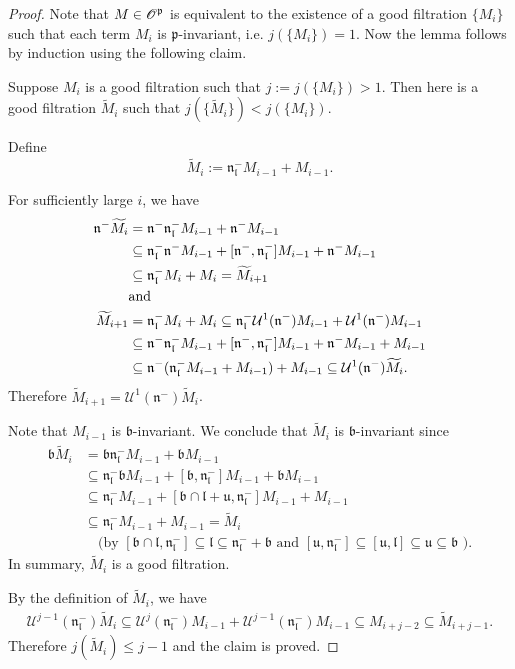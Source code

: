 \documentclass{amsart}[12pt]
\def\fbb{\mathfrak{b}}
\def\fnn{\mathfrak{n}}
\def\fpp{\mathfrak{p}}
\def\fuu{\mathfrak{u}}
\def\fll{\mathfrak{l}}
\def\fbb{\mathfrak{b}}
\def\cU{\mathcal{U}}
\def\tM{\widetilde{M}}
\renewcommand{\subset}{\subseteq}
\numberwithin{equation}{section}
\begin{document}
\begin{proof}
	
    Note that $M\in \sO^\fpp$ is equivalent to the existence of a good filtration $\{M_i\}$ such 
	that each term $M_i$ is $\fpp$-invariant, i.e. $j(\{M_i\}) = 1$. 
	Now the lemma follows by induction using the following claim. 

	 Suppose $M_i$ is a good filtration such that 
	$j:=j(\{M_i\})>1$. Then here is a good filtration $\tM_i$ such that $j(\{\tM_i\}) < j(\{M_i\})$.

	\proof
	Define 
	\[
		\tM_i := \fnn_\fll^- M_{i-1} + M_{i-1}.
	\]	

	For sufficiently large $i$, we have 
	\[
	\begin{split}
		\fnn^- \tM_i & = \fnm \fnlm M_{i-1} + \fnm M_{i-1}\\
		 &\subset  \fnlm \fnm M_{i-1} + [\fnm,\fnlm] M_{i-1} + \fnm M_{i-1} \\
		 &\subset \fnlm  M_i + M_i = \tM_{i+1} \\
		 & \text{and}\\
	\tM_{i+1} 	& = \fnn_\fll^- M_i + M_i \subset \fnlm \cU^1(\fnm) M_{i-1} +
	\cU^1(\fnm) M_{i-1} \\
	& \subset \fnn^- \fnn_\fll^- M_{i-1} + [\fnn^-, \fnn^-_\fll] M_{i-1}
	+ \fnn^- M_{i-1} + M_{i-1}\\
	& \subset \fnn^- (\fnn_\fll^- M_{i-1}+ M_{i-1}) + M_{i-1} \subset  \cU^1(\fnn^-) \tM_{i}.
	\end{split}
	\]
	Therefore $\tM_{i+1}=\cU^1(\fnn^-) \tM_{i}$. %

	Note that $M_{i-1}$ is $\fbb$-invariant. We conclude that  
	$\tM_i$ is $\fbb$-invariant since %
	\[
	\begin{split}
	\fbb\tM_i &= \fbb\fnn_{\fll}^- M_{i-1}   + \fbb M_{i-1}\\
	& \subset \fnn_{\fll}^- \fbb M_{i-1} + [\fbb, \fnn_{\fll}^-] M_{i-1} + \fbb M_{i-1}  \\
	& \subset  \fnn_{\fll}^- M_{i-1} + [\fbb\cap \fll + \fuu, \fnn_{\fll}^-]
	M_{i-1}  + M_{i-1}\\
	& \subset \fnn_{\fll}^- M_{i-1} + M_{i-1} = \tM_i\\
	& \quad  \text{(by $[\fbb\cap \fll, \fnn_{\fll}^-] \subset \fll \subset \fnn_\fll^-
		+ \fbb$ and $[\fuu, \fnn_{\fll}^-]\subset[\fuu, \fll] \subset \fuu\subset \fbb$ )}.
	\end{split}
	\]
	In summary, $\tM_i$ is a good filtration. 

	By the definition of $\tM_i$, we have 
	\[
	\begin{split}
	\cU^{j-1}(\fnn_{\fll}^-)\tM_i \subset \cU^j(\fnn_\fll^-)M_{i-1} +
	\cU^{j-1}(\fnn_\fll^-)M_{i-1} \subset M_{i+j-2}\subset \tM_{i+j-1}.
	\end{split}
	\]
	Therefore $j(\tM_i)\leq  j-1$ and the claim is proved.    
\end{proof}
\end{document}
